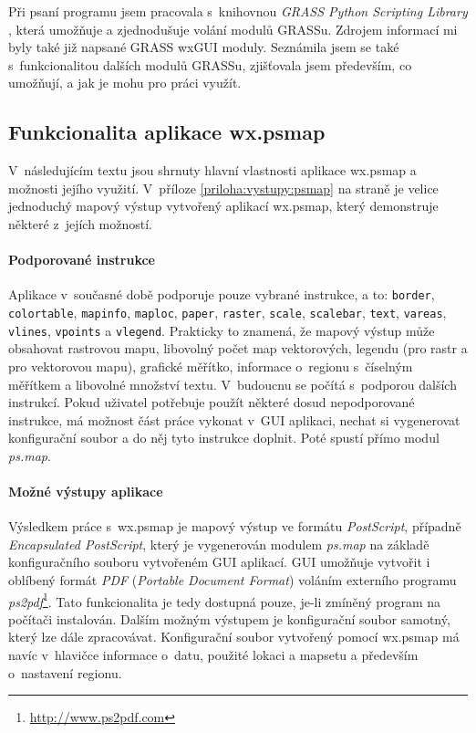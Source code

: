 \documentclass[a4paper,12pt,draft]{article}
\newif\ifbc %
\newcommand{\modul}[1]{\emph{#1}}
\newcommand{\instr}[1]{\lstinline[style=psmapInline]|#1|}
\begin{document}
Při psaní programu jsem pracovala s~knihovnou \emph{GRASS Python
Scripting Library} \cite{script}, která umožňuje a zjednodušuje
volání modulů GRASSu. Zdrojem informací mi byly také
již napsané GRASS wxGUI moduly. Seznámila jsem se také s~funkcionalitou
dalších  modulů GRASSu, zjišťovala
jsem především, co umožňují, a jak je mohu pro práci využít.

\subsection{Funkcionalita aplikace wx.psmap}
V~následujícím textu jsou shrnuty hlavní vlastnosti aplikace wx.psmap a
možnosti jejího využití.
\ifbc\else V~příloze \ref{priloha:vystupy:psmap} na
straně \pageref{priloha:vystupy:psmap} je velice jednoduchý mapový výstup
vytvořený aplikací wx.psmap, který demonstruje některé z~jejích možností.\fi

\paragraph*{Podporované instrukce}
Aplikace v~současné době podporuje pouze vybrané instrukce, a to:
\instr{border}, \instr{colortable}, \instr{mapinfo}, \instr{maploc},
\instr{paper}, \instr{raster}, \instr{scale}, \instr{scalebar},
\instr{text}, \instr{vareas}, \instr{vlines}, \instr{vpoints} a
\instr{vlegend}. Prakticky to znamená, že mapový výstup může
obsahovat rastrovou mapu, libovolný počet map vektorových, legendu (pro
rastr a pro vektorovou mapu), grafické měřítko, informace o~regionu
s~číselným měřítkem a libovolné množství textu. V~budoucnu se
počítá s~podporou dalších instrukcí. Pokud uživatel potřebuje
použít některé dosud nepodporované instrukce, má možnost část
práce vykonat v~GUI aplikaci, nechat si vygenerovat konfigurační
soubor a do něj tyto instrukce doplnit. Poté spustí přímo modul
\modul{ps.map}.

\paragraph*{Možné výstupy aplikace}
Výsledkem práce s~wx.psmap je mapový výstup ve formátu \emph{PostScript},
případně \emph{Encapsulated PostScript}, který je vygenerován modulem
\modul{ps.map} na základě konfiguračního souboru vytvořeném GUI
aplikací. GUI umožňuje vytvořit i oblíbený formát \emph{PDF} (\emph{Portable
Document Format}) voláním externího programu
\emph{ps2pdf}\footnote{\url{http://www.ps2pdf.com}}. Tato funkcionalita je tedy
dostupná pouze, je-li zmíněný program na počítači instalován. Dalším možným
výstupem je konfigurační soubor samotný,
který lze dále zpracovávat. Konfigurační soubor vytvořený pomocí
wx.psmap má navíc v~hlavičce informace o~datu, použité lokaci a
mapsetu a především o~nastavení regionu.
\end{document}
